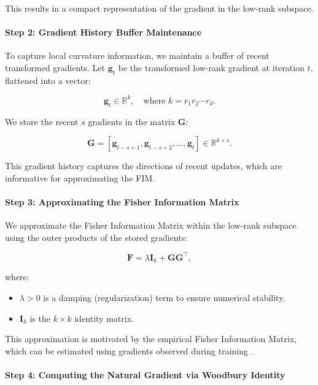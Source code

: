 This results in a compact representation of the gradient in the low-rank subspace.

\paragraph{Step 2: Gradient History Buffer Maintenance}



To capture local curvature information, we maintain a buffer of recent transformed gradients. Let $\mathbf{g}_t$ be the transformed low-rank gradient at iteration $t$, flattened into a vector:

\[
\mathbf{g}_t \in \mathbb{R}^{k}, \quad \text{where } k = r_1 r_2 \cdots r_d.
\]

We store the recent $s$ gradients in the matrix $\mathbf{G}$:

\[
\mathbf{G} = [\mathbf{g}_{t - s + 1}, \mathbf{g}_{t - s + 2}, \dots, \mathbf{g}_t] \in \mathbb{R}^{k \times s}.
\]

This gradient history captures the directions of recent updates, which are informative for approximating the FIM.

\paragraph{Step 3: Approximating the Fisher Information Matrix}

We approximate the Fisher Information Matrix within the low-rank subspace using the outer products of the stored gradients:

\[
\mathbf{F} = \lambda \mathbf{I}_k + \mathbf{G} \mathbf{G}^\top,
\]

where:

\begin{itemize}
    \item $\lambda > 0$ is a damping (regularization) term to ensure numerical stability.
    \item $\mathbf{I}_k$ is the $k \times k$ identity matrix.
\end{itemize}

This approximation is motivated by the empirical Fisher Information Matrix, which can be estimated using gradients observed during training \citep{martensNewPerspectiveNatural2014}.

\paragraph{Step 4: Computing the Natural Gradient via Woodbury Identity}

